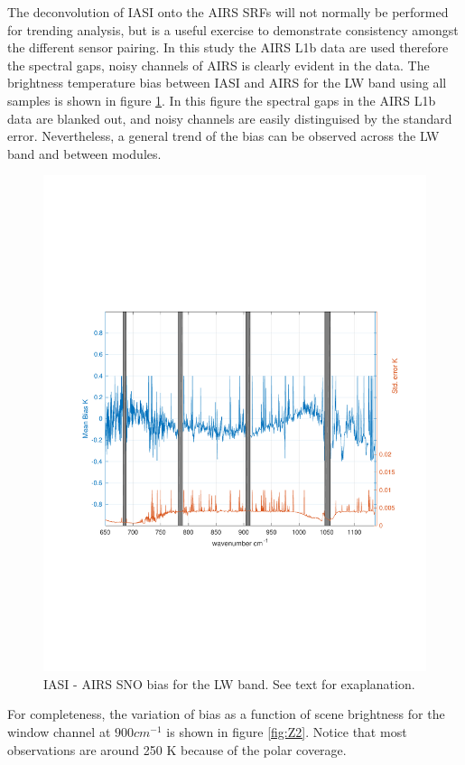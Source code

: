 \documentclass[twocolumn,10pt]{article}
\begin{document}
The deconvolution of IASI onto the AIRS SRFs will not normally be performed for trending analysis, but is a useful exercise to demonstrate consistency amongst the different sensor pairing. In this study the AIRS L1b data are used therefore the spectral gaps, noisy channels of AIRS is clearly evident in the data. The
brightness temperature bias between IASI and AIRS for the LW band using all samples is shown in figure \ref{fig:Z1}. In this figure the spectral gaps in the AIRS L1b data are blanked out, and noisy channels are easily distinguised by the standard error. Nevertheless, a general trend of the bias can be observed across the LW band and between modules.

\begin{figure}[htb]
\centering
\includegraphics[width=.\linewidth]{./figs/fig1.pdf}
\caption{\label{fig:orgparagraph19}
  IASI - AIRS SNO bias for the LW band. See text for exaplanation.}
\label{fig:Z1}
\end{figure}

For completeness, the variation of bias as a function of scene brightness for the window channel at $ 900 cm^{-1} $ is shown in figure \ref{fig:Z2}. Notice that most observations are around 250 K because of the polar coverage.
\end{document}
